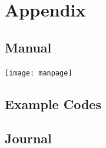 \appendix
\part*{Appendix}

\chapter{Manual}
\centerline{\texttt{[image: manpage]}}
%




\chapter{Example Codes}
\label{ctr:exampleCode}


\chapter{Journal}


